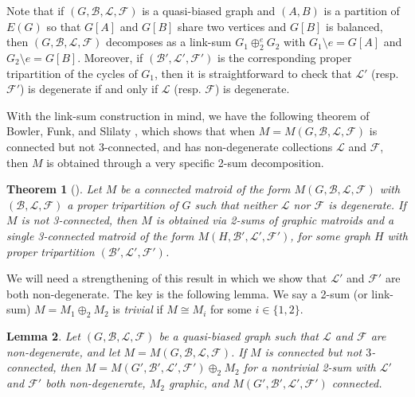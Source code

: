 \documentclass[12pt]{article}
\newtheorem{theorem}{Theorem}[section]
\newtheorem{lemma}[theorem]{Lemma}
\theoremstyle{definition}
\theoremstyle{plain} %
\newcommand{\cB}{\mathcal{B}}
\newcommand{\cF}{\mathcal{F}}
\newcommand{\cL}{\mathcal{L}}
\newcommand{\del}{\!\setminus\!}
\newcommand{\qbg}{\ensuremath{(G,\cB,\cL,\cF)}}
\begin{document}
Note that if $(G, \cB, \cL, \cF)$ is a quasi-biased graph and $(A, B)$ is a partition of $E(G)$ so that $G[A]$ and $G[B]$ share two vertices and $G[B]$ is balanced, then $(G, \cB, \cL, \cF)$ decomposes as a link-sum $G_1 \oplus_2^e G_2$ with $G_1 \del e = G[A]$ and $G_2 \del e = G[B]$.
Moreover, if $(\cB', \cL', \cF')$ is the corresponding proper tripartition of the cycles of $G_1$, then it is straightforward to check that $\cL'$ (resp. $\cF'$) is degenerate if and only if $\cL$ (resp. $\cF$) is degenerate.

With the link-sum construction in mind, we have the following theorem of Bowler, Funk, and Slilaty \cite{Bowler-Funk-Slilaty20}, which shows that when $M=M\qbg$ is connected but not 3-connected, and has non-degenerate collections $\cL$ and $\cF$, then $M$ is obtained through a very specific 2-sum decomposition.


\begin{theorem}[{\cite[Theorem 4.8]{Bowler-Funk-Slilaty20}}]\label{thm: non-degen decomposition}
    Let $M$ be a connected matroid of the form $M(G,\cB,\cL,\cF)$ with $(\cB,\cL,\cF)$ a proper tripartition of $G$ such that neither $\cL$ nor $\cF$ is degenerate. If $M$ is not 3-connected, then $M$ is obtained via 2-sums of graphic matroids and a single 3-connected matroid of the form $M(H,\cB',\cL',\cF')$, for some graph $H$ with proper tripartition $(\cB',\cL',\cF')$.
\end{theorem}

We will need a strengthening of this result in which we show that $\cL'$ and $\cF'$ are both non-degenerate.
The key is the following lemma. We say a 2-sum (or link-sum) $M=M_1\oplus_2M_2$ is \emph{trivial} if $M\cong M_i$ for some $i\in\{1,2\}$.

\begin{lemma} \label{lem: doubly non-degenerate implies 2-sum with graphic}
Let $(G, \cB, \cL, \cF)$ be a quasi-biased graph such that $\cL$ and $\cF$ are non-degenerate, and let $M = M(G, \cB, \cL, \cF)$. If $M$ is connected but not $3$-connected, then $M = M(G', \cB', \cL', \cF') \oplus_2 M_2$ for a nontrivial 2-sum with $\cL'$ and $\cF'$ both non-degenerate, $M_2$ graphic, and $M(G', \cB', \cL', \cF')$ connected.
\end{lemma}
\end{document}
